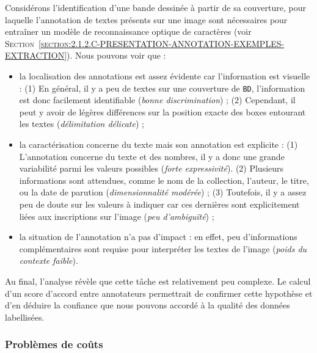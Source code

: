 			\begin{leftBarExamples}
				Considérons l'identification d'une bande dessinée à partir de sa couverture, pour laquelle l'annotation de textes présents sur une image sont nécessaires pour entraîner un modèle de reconnaissance optique de caractères (voir \textsc{Section~\ref{section:2.1.2.C-PRESENTATION-ANNOTATION-EXEMPLES-EXTRACTION}}).
				Nous pouvons voir que :
				\begin{itemize}
					\item la localisation des annotations est assez évidente car l'information est visuelle : 
					(1) En général, il y a peu de textes sur une couverture de \texttt{BD}, l'information est donc facilement identifiable (\textit{bonne discrimination}) ;
					(2) Cependant, il peut y avoir de légères différences sur la position exacte des boxes entourant les textes (\textit{délimitation délicate}) ;
					\item la caractérisation concerne du texte mais son annotation est explicite :
					(1) L'annotation concerne du texte et des nombres, il y a donc une grande variabilité parmi les valeurs possibles (\textit{forte expressivité}).
					(2) Plusieurs informations sont attendues, comme le nom de la collection, l'auteur, le titre, ou la date de parution (\textit{dimensionnalité modérée}) ;
					(3) Toutefois, il y a assez peu de doute sur les valeurs à indiquer car ces dernières sont explicitement liées aux inscriptions sur l'image (\textit{peu d'ambiguïté}) ;
					\item la situation de l'annotation n'a pas d'impact :
					en effet, peu d'informations complémentaires sont requise pour interpréter les textes de l'image (\textit{poids du contexte faible}).
				\end{itemize}
				Au final, l'analyse révèle que cette tâche est relativement peu complexe.
				Le calcul d'un score d'accord entre annotateurs permettrait de confirmer cette hypothèse et d'en déduire la confiance que nous pouvons accordé à la qualité des données labellisées.
			\end{leftBarExamples}
			
			
		\subsubsection{Problèmes de coûts}
		\label{section:2.3.2.C-DEFIS-ANNOTATION-ASPECT-COMPLEXITE-COUTS}
		
